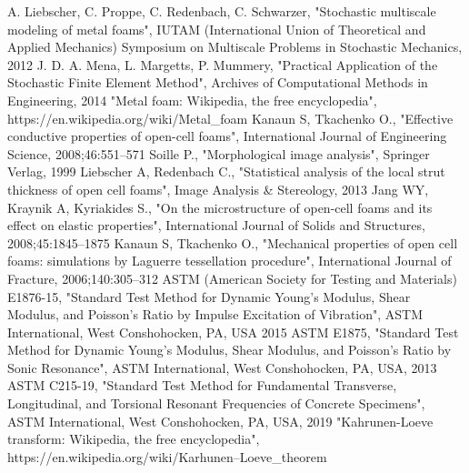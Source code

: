\documentclass{article}
\begin{document}
\begin{thebibliography}{999}
A. Liebscher, C. Proppe, C. Redenbach, C. Schwarzer, "Stochastic multiscale modeling of metal foams", IUTAM (International Union of Theoretical and Applied Mechanics) Symposium on Multiscale Problems in Stochastic Mechanics, 2012
J. D. A. Mena, L. Margetts, P. Mummery, "Practical Application of the Stochastic Finite Element Method", Archives of Computational Methods in Engineering, 2014
"Metal foam: Wikipedia, the free encyclopedia", https://en.wikipedia.org/wiki/Metal\_foam
Kanaun S, Tkachenko O., "Effective conductive properties of open-cell foams", International Journal of Engineering Science, 2008;46:551–571
Soille P., "Morphological image analysis", Springer Verlag, 1999
Liebscher A, Redenbach C., "Statistical analysis of the local strut thickness of open cell foams", Image Analysis \& Stereology, 2013
Jang WY, Kraynik A, Kyriakides S., "On the microstructure of open-cell foams and its effect on elastic properties", International Journal of Solids and Structures, 2008;45:1845–1875
Kanaun S, Tkachenko O., "Mechanical properties of open cell foams: simulations by Laguerre tessellation procedure", International Journal of Fracture, 2006;140:305–312
ASTM (American Society for Testing and Materials) E1876-15, "Standard Test Method for Dynamic Young's Modulus, Shear Modulus, and Poisson's Ratio by Impulse Excitation of Vibration", ASTM International, West Conshohocken, PA, USA 2015
ASTM E1875, "Standard Test Method for Dynamic Young’s Modulus, Shear Modulus, and Poisson’s Ratio by Sonic Resonance", ASTM International, West Conshohocken, PA, USA, 2013
ASTM C215-19, "Standard Test Method for Fundamental Transverse, Longitudinal, and Torsional Resonant Frequencies of Concrete Specimens", ASTM International, West Conshohocken, PA, USA, 2019
"Kahrunen-Loeve transform: Wikipedia, the free encyclopedia", https://en.wikipedia.org/wiki/Karhunen–Loeve\_theorem
\end{thebibliography}
\end{document}

